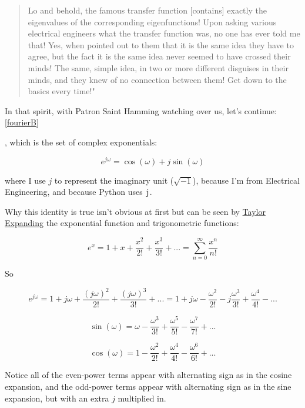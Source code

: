 \documentclass[10pt]{article}
\begin{document}
{\begin{quotation}
Lo and behold, the famous transfer function [contains] exactly the eigenvalues of the corresponding eigenfunctions! Upon asking various electrical engineers what the transfer function was, no one has ever told me that! Yes, when pointed out to them that it is the same idea they have to agree, but the fact it is the same idea never seemed to have crossed their minds! The same, simple idea, in two or more different disguises in their minds, and they knew of no connection between them! Get down to the basics every time!"\end{quotation}

In that spirit, with Patron Saint Hamming watching over us, let's continue: \autoref{fourierB}}, which is the set of complex exponentials:\vspace{-2mm}

\begin{equation}\label{euler}
e^{j \omega} = \cos(\omega) + j \sin(\omega)
\end{equation}

where I use $j$ to represent the imaginary unit ($\sqrt{-1}$), because I'm from Electrical Engineering, and because Python uses \texttt{j}.\newline

Why this identity is true isn't obvious at first but can be seen by \href{https://math.stackexchange.com/a/492165/278341}{Taylor Expanding}\cite{taylor} the exponential function and trigonometric functions:

$$e^x = 1 + x + \frac{x^2}{2!} + \frac{x^3}{3!} + ... = \sum_{n=0}^{\infty} \frac{x^n}{n!}$$

So\vspace{-2mm}

$$e^{j \omega} = 1 + j \omega + \frac{(j \omega)^2}{2!} + \frac{(j \omega)^3}{3!} + ... = 1 + j \omega - \frac{\omega^2}{2!} - j \frac{\omega^3}{3!} + \frac{\omega^4}{4!} - ...$$

$$\sin(\omega) = \omega - \frac{\omega^3}{3!} + \frac{\omega^5}{5!} - \frac{\omega^7}{7!} + ...$$

$$\cos(\omega) = 1 - \frac{\omega^2}{2!} + \frac{\omega^4}{4!} - \frac{\omega^6}{6!} + ...$$\vspace{0mm}

Notice all of the even-power terms appear with alternating sign as in the cosine expansion, and the odd-power terms appear with alternating sign as in the sine expansion, but with an extra $j$ multiplied in.
\end{document}
